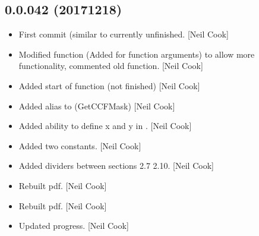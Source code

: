 \documentclass[a4paper,10pt,english]{report}
\begin{document}
\subsection{0.0.042 (2017\sphinxhyphen{}12\sphinxhyphen{}18)}
\label{\detokenize{misc/changelog:id529}}\begin{itemize}
\item {} 
First commit (similar to  \textendash{} currently unfinished.
{[}Neil Cook{]}

\item {} 
Modified  function (Added for function
arguments) to allow more functionality, commented old function. {[}Neil
Cook{]}

\item {} 
Added start of  function (not finished) {[}Neil Cook{]}

\item {} 
Added alias to  (GetCCFMask) {[}Neil Cook{]}

\item {} 
Added ability to define x and y in . {[}Neil
Cook{]}

\item {} 
Added two  constants. {[}Neil Cook{]}

\item {} 
Added dividers between sections 2.7 \sphinxhyphen{} 2.10. {[}Neil Cook{]}

\item {} 
Rebuilt pdf. {[}Neil Cook{]}

\item {} 
Rebuilt pdf. {[}Neil Cook{]}

\item {} 
Updated progress. {[}Neil Cook{]}

\end{itemize}
\end{document}

